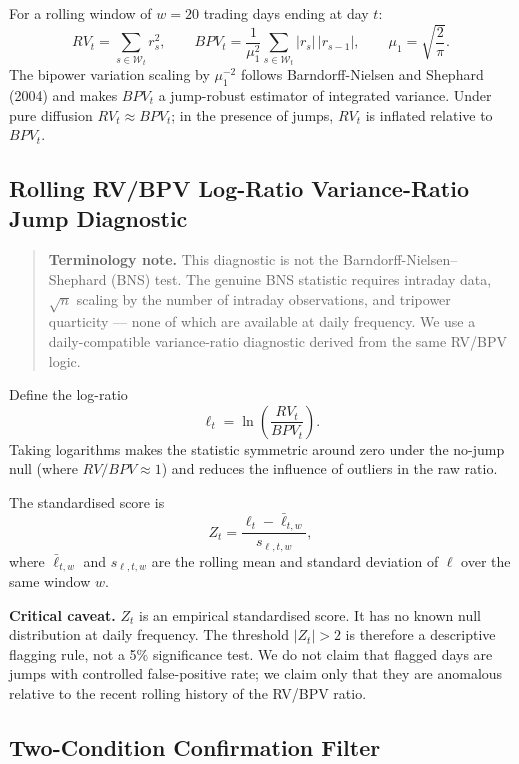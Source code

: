 \documentclass[11pt,a4paper]{article}
\begin{document}
For a rolling window of $w=20$ trading days ending at day $t$:
\[
RV_t=\sum_{s\in\mathcal{W}_t} r_s^2,
\qquad
BPV_t=\frac{1}{\mu_1^2}\sum_{s\in\mathcal{W}_t} |r_s|\,|r_{s-1}|,
\qquad
\mu_1=\sqrt{\frac{2}{\pi}}.
\]
The bipower variation scaling by $\mu_1^{-2}$ follows Barndorff-Nielsen and Shephard (2004) and makes $BPV_t$ a jump-robust estimator of integrated variance. Under pure diffusion $RV_t \approx BPV_t$; in the presence of jumps, $RV_t$ is inflated relative to $BPV_t$.

\subsection{Rolling RV/BPV Log-Ratio Variance-Ratio Jump Diagnostic}

\begin{quote}
\textbf{Terminology note.} This diagnostic is not the Barndorff-Nielsen--Shephard (BNS) test. The genuine BNS statistic requires intraday data, $\sqrt{n}$ scaling by the number of intraday observations, and tripower quarticity --- none of which are available at daily frequency. We use a daily-compatible variance-ratio diagnostic derived from the same RV/BPV logic.
\end{quote}

Define the log-ratio
\begin{equation}
\ell_t=\ln\left(\frac{RV_t}{BPV_t}\right).
\label{eq:logratio}
\end{equation}
Taking logarithms makes the statistic symmetric around zero under the no-jump null (where $RV/BPV \approx 1$) and reduces the influence of outliers in the raw ratio.

The standardised score is
\begin{equation}
Z_t=\frac{\ell_t-\bar{\ell}_{t,w}}{s_{\ell,t,w}},
\label{eq:Zt}
\end{equation}
where $\bar{\ell}_{t,w}$ and $s_{\ell,t,w}$ are the rolling mean and standard deviation of $\ell$ over the same window $w$.

\medskip
\noindent\textbf{Critical caveat.} $Z_t$ is an empirical standardised score. It has no known null distribution at daily frequency. The threshold $|Z_t|>2$ is therefore a descriptive flagging rule, not a 5\% significance test. We do not claim that flagged days are jumps with controlled false-positive rate; we claim only that they are anomalous relative to the recent rolling history of the RV/BPV ratio.

\subsection{Two-Condition Confirmation Filter}
\end{document}
